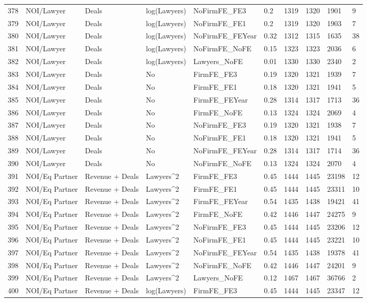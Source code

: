 \documentclass{article}
\begin{document}
\begin{table}[H]
\begin{tabular}{rlllllllll}
  378 & NOI/Lawyer & Deals & log(Lawyers) & NoFirmFE\_FE3 & 0.2 & 1319 & 1320 & 1901 & 9 \\ 
  379 & NOI/Lawyer & Deals & log(Lawyers) & NoFirmFE\_FE1 & 0.2 & 1319 & 1320 & 1903 & 7 \\ 
  380 & NOI/Lawyer & Deals & log(Lawyers) & NoFirmFE\_FEYear & 0.32 & 1312 & 1315 & 1635 & 38 \\ 
  381 & NOI/Lawyer & Deals & log(Lawyers) & NoFirmFE\_NoFE & 0.15 & 1323 & 1323 & 2036 & 6 \\ 
  382 & NOI/Lawyer & Deals & log(Lawyers) & Lawyers\_NoFE & 0.01 & 1330 & 1330 & 2340 & 2 \\ 
  383 & NOI/Lawyer & Deals & No & FirmFE\_FE3 & 0.19 & 1320 & 1321 & 1939 & 7 \\ 
  384 & NOI/Lawyer & Deals & No & FirmFE\_FE1 & 0.18 & 1320 & 1321 & 1941 & 5 \\ 
  385 & NOI/Lawyer & Deals & No & FirmFE\_FEYear & 0.28 & 1314 & 1317 & 1713 & 36 \\ 
  386 & NOI/Lawyer & Deals & No & FirmFE\_NoFE & 0.13 & 1324 & 1324 & 2069 & 4 \\ 
  387 & NOI/Lawyer & Deals & No & NoFirmFE\_FE3 & 0.19 & 1320 & 1321 & 1938 & 7 \\ 
  388 & NOI/Lawyer & Deals & No & NoFirmFE\_FE1 & 0.18 & 1320 & 1321 & 1941 & 5 \\ 
  389 & NOI/Lawyer & Deals & No & NoFirmFE\_FEYear & 0.28 & 1314 & 1317 & 1714 & 36 \\ 
  390 & NOI/Lawyer & Deals & No & NoFirmFE\_NoFE & 0.13 & 1324 & 1324 & 2070 & 4 \\ 
  391 & NOI/Eq Partner & Revenue + Deals & Lawyers^2 & FirmFE\_FE3 & 0.45 & 1444 & 1445 & 23198 & 12 \\ 
  392 & NOI/Eq Partner & Revenue + Deals & Lawyers^2 & FirmFE\_FE1 & 0.45 & 1444 & 1445 & 23311 & 10 \\ 
  393 & NOI/Eq Partner & Revenue + Deals & Lawyers^2 & FirmFE\_FEYear & 0.54 & 1435 & 1438 & 19421 & 41 \\ 
  394 & NOI/Eq Partner & Revenue + Deals & Lawyers^2 & FirmFE\_NoFE & 0.42 & 1446 & 1447 & 24275 & 9 \\ 
  395 & NOI/Eq Partner & Revenue + Deals & Lawyers^2 & NoFirmFE\_FE3 & 0.45 & 1444 & 1445 & 23206 & 12 \\ 
  396 & NOI/Eq Partner & Revenue + Deals & Lawyers^2 & NoFirmFE\_FE1 & 0.45 & 1444 & 1445 & 23221 & 10 \\ 
  397 & NOI/Eq Partner & Revenue + Deals & Lawyers^2 & NoFirmFE\_FEYear & 0.54 & 1435 & 1438 & 19378 & 41 \\ 
  398 & NOI/Eq Partner & Revenue + Deals & Lawyers^2 & NoFirmFE\_NoFE & 0.42 & 1446 & 1447 & 24201 & 9 \\ 
  399 & NOI/Eq Partner & Revenue + Deals & Lawyers^2 & Lawyers\_NoFE & 0.12 & 1467 & 1467 & 36766 & 2 \\ 
  400 & NOI/Eq Partner & Revenue + Deals & log(Lawyers) & FirmFE\_FE3 & 0.45 & 1444 & 1445 & 23347 & 12 \\ 
   \hline
\end{tabular}
\end{table}
\end{document}
